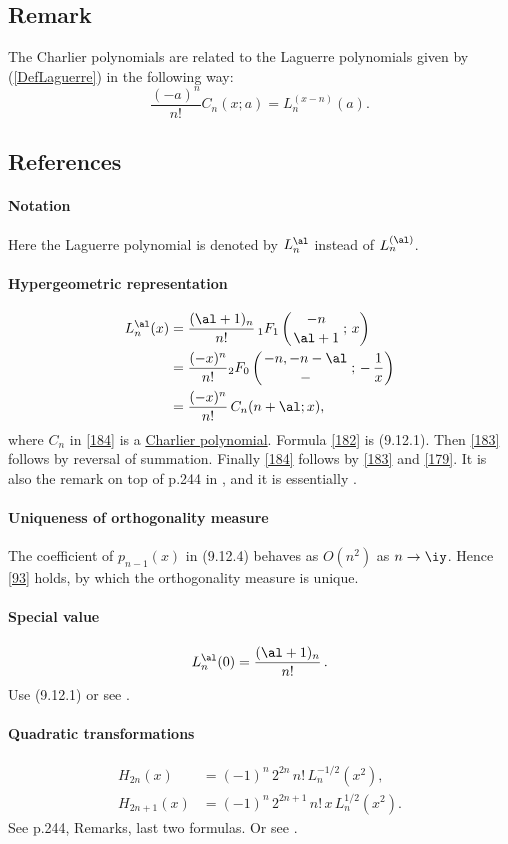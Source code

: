\documentclass[envcountchap,graybox]{svmono}
\newcommand{\hyp}[5]{\mbox{}_{#1}{F}_{#2}
\left(\genfrac{}{}{0pt}{}{#3}{#4}\,;\,#5\right)}
\begin{document}
\subsection*{Remark}
The Charlier polynomials are related to the Laguerre polynomials given by (\ref{DefLaguerre})
in the following way:
$$\frac{(-a)^n}{n!}C_n(x;a)=L_n^{(x-n)}(a).$$

\subsection*{References}
\label{sec9.12}
\paragraph{Notation}
Here the Laguerre polynomial is denoted by $L_n^\al$ instead of
$L_n^{(\al)}$.
%
\paragraph{Hypergeometric representation}
\begin{align}
L_n^\al(x)&=
\frac{(\al+1)_n}{n!}\,\hyp11{-n}{\al+1}x
\label{182}\\
&=\frac{(-x)^n}{n!} \hyp20{-n,-n-\al}-{-\,\frac1x}
\label{183}\\
&=\frac{(-x)^n}{n!}\,C_n(n+\al;x),
\label{184}
\end{align}
where $C_n$ in \eqref{184} is a
\hyperref[sec9.14]{Charlier polynomial}.
Formula \eqref{182} is (9.12.1). Then \eqref{183} follows by reversal
of summation. Finally \eqref{184} follows by \eqref{183} and \eqref{179}.
It is also the remark on top of p.244 in , and it is essentially
.
%
\paragraph{Uniqueness of orthogonality measure}
The coefficient of $p_{n-1}(x)$ in (9.12.4) behaves as $O(n^2)$ as $n\to\iy$.
Hence \eqref{93} holds, by which the orthogonality measure is unique.
%
\paragraph{Special value}
\begin{equation}
L_n^{\al}(0)=\frac{(\al+1)_n}{n!}\,.
\label{53}
\end{equation}
Use (9.12.1) or see .
%
\paragraph{Quadratic transformations}
\begin{align}
H_{2n}(x)&=(-1)^n\,2^{2n}\,n!\,L_n^{-1/2}(x^2),
\label{54}\\
H_{2n+1}(x)&=(-1)^n\,2^{2n+1}\,n!\,x\,L_n^{1/2}(x^2).
\label{55}
\end{align}
See p.244, Remarks, last two formulas.
Or see .
%
\end{document}
